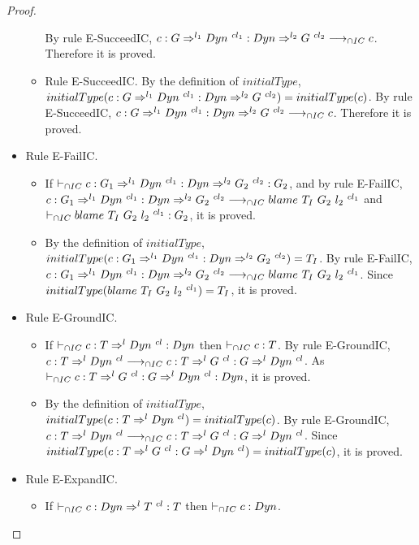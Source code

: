 \documentclass[a4paper]{article}
\begin{document}
\begin{proof}
\begin{itemize}
\begin{itemize}
        By rule E-SucceedIC, $c : G \Rightarrow^{l_1} Dyn\ ^{cl_1} : Dyn \Rightarrow^{l_2} G\ ^{cl_2} \longrightarrow_{\cap IC} c$.
        Therefore it is proved.
        \item Rule E-SucceedIC.
        By the definition of $initialType$, $initialType(c : G \Rightarrow^{l_1} \Dyn\ ^{cl_1} : \Dyn \Rightarrow^{l_2} G\ ^{cl_2}) = initialType(c)$.
        By rule E-SucceedIC, $c : G \Rightarrow^{l_1} Dyn\ ^{cl_1} : Dyn \Rightarrow^{l_2} G\ ^{cl_2} \longrightarrow_{\cap IC} c$.
        Therefore it is proved.
    \end{itemize}
    \item Rule E-FailIC.
    \begin{itemize}
        \item If $\vdash_{\cap IC} c : G_1 \Rightarrow^{l_1} Dyn\ ^{cl_1} : Dyn \Rightarrow^{l_2} G_2\ ^{cl_2} : G_2$, and by rule E-FailIC, $c : G_1 \Rightarrow^{l_1} \Dyn\ ^{cl_1} : \Dyn \Rightarrow^{l_2} G_2\ ^{cl_2} \icos \blamecast{T_I}{G_2}{l_2}{cl_1}$ and $\vdash_{\cap IC} blame\ T_I\ G_2\ l_2\ ^{cl_1} : G_2$, it is proved.
        \item By the definition of $initialType$, $initialType(c : G_1 \Rightarrow^{l_1} \Dyn\ ^{cl_1} : \Dyn \Rightarrow^{l_2} G_2\ ^{cl_2}) = T_I$.
        By rule E-FailIC, $c : G_1 \Rightarrow^{l_1} \Dyn\ ^{cl_1} : \Dyn \Rightarrow^{l_2} G_2\ ^{cl_2} \icos \blamecast{T_I}{G_2}{l_2}{cl_1}$.
        Since $initialType(blame\ T_I\ G_2\ l_2\ ^{cl_1}) = T_I$, it is proved.
    \end{itemize}
    \item Rule E-GroundIC.
    \begin{itemize}
        \item If $\icts c : T \Rightarrow^l \Dyn\ ^{cl} : \Dyn$ then $\vdash_{\cap IC} c : T$.
        By rule E-GroundIC, $c : T \Rightarrow^l Dyn\ ^{cl} \longrightarrow_{\cap IC} c : T \Rightarrow^l G\ ^{cl} : G \Rightarrow^l Dyn\ ^{cl}$.
        As $\vdash_{\cap IC} c : T \Rightarrow^l G\ ^{cl} : G \Rightarrow^l Dyn\ ^{cl} : Dyn$, it is proved.
        \item By the definition of $initialType$, $initialType(c : T \Rightarrow^l Dyn\ ^{cl}) = initialType(c)$.
        By rule E-GroundIC, $c : T \Rightarrow^l Dyn\ ^{cl} \longrightarrow_{\cap IC} c : T \Rightarrow^l G\ ^{cl} : G \Rightarrow^l Dyn\ ^{cl}$.
        Since $initialType(c : T \Rightarrow^l G\ ^{cl} : G \Rightarrow^l Dyn\ ^{cl}) = initialType(c)$, it is proved.
    \end{itemize}
    \item Rule E-ExpandIC.
    \begin{itemize}
        \item If $\icts c : \Dyn \Rightarrow^l T\ ^{cl} : T$ then $\vdash_{\cap IC} c : Dyn$.

\end{itemize}
\end{itemize}
\end{proof}
\end{document}
